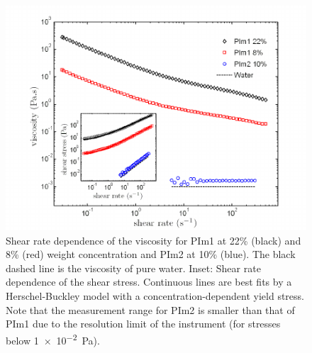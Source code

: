 \documentclass[prl,a4paper,twocolumn,superscriptaddress,showkeys]{revtex4}
\begin{document}
\begin{figure}
\includegraphics{fig3}
\caption{Shear rate dependence of the viscosity for PIm1 at 22\% (black) and 8\% (red) weight concentration and PIm2 at 10\% (blue). The black dashed line is the viscosity of pure water. Inset: Shear rate dependence of the shear stress. Continuous lines are best fits by a Herschel-Buckley model with a concentration-dependent yield stress. Note that the measurement range for PIm2 is smaller than that of PIm1 due to the resolution limit of the instrument (for stresses below \SI{1e-2}{\pascal}).}
\label{fig:yieldstress}
\end{figure}
\end{document}
